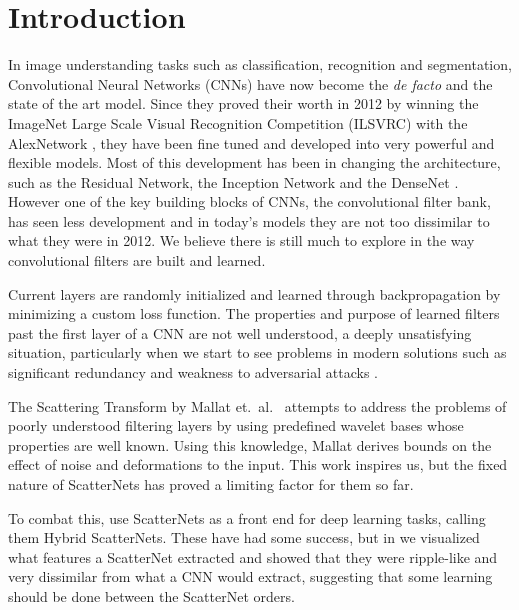 \section{Introduction}

In image understanding tasks such as classification, recognition and segmentation,
Convolutional Neural Networks (CNNs) have now become the \emph{de facto} and the state
of the art model. Since they proved their worth in 2012 by winning the ImageNet
Large Scale Visual Recognition Competition (ILSVRC) \cite{russakovsky_imagenet_2014}
with the AlexNetwork \cite{krizhevsky_imagenet_2012}, they have been fine tuned and developed into very
powerful and flexible models. Most of this development has been in changing the
architecture, such as the Residual Network\cite{he_deep_2016}, the Inception
Network \cite{szegedy_going_2015} and the DenseNet \cite{huang_densely_2017}.
However one of the key building blocks of CNNs, the convolutional filter bank,
has seen less development and in today's models they are not too dissimilar to
what they were in 2012. %
%
%
We believe there is still much to explore in the way convolutional 
filters are built and learned. 

Current layers are randomly initialized and learned through backpropagation by
minimizing a custom loss function.
The properties and purpose of learned filters
past the first layer of a CNN are not well understood, a deeply unsatisfying
situation, particularly when we start to see problems in modern solutions such as significant redundancy
\cite{denton_exploiting_2014} and weakness to adversarial attacks
\cite{carlini_towards_2017}. 

The Scattering Transform by Mallat et.\ al.\ \cite{mallat_group_2012, bruna_invariant_2013} 
attempts to address the problems of poorly understood filtering layers 
by using predefined wavelet bases whose properties are well known. Using
this knowledge, Mallat derives bounds on the effect of 
noise and deformations to the input. This work inspires us, but the
fixed nature of ScatterNets has proved a limiting factor for them so far.

To combat this, \cite{oyallon_scaling_2017, oyallon_hybrid_2017,
singh_scatternet_2018} use ScatterNets as a front end for deep learning tasks,
calling them Hybrid ScatterNets. These have had some success, but
in \cite{cotter_visualizing_2017} we visualized what features a ScatterNet extracted
and showed that they were ripple-like and very dissimilar from what a CNN would
extract, suggesting that some learning should be done between the ScatterNet
orders. 

